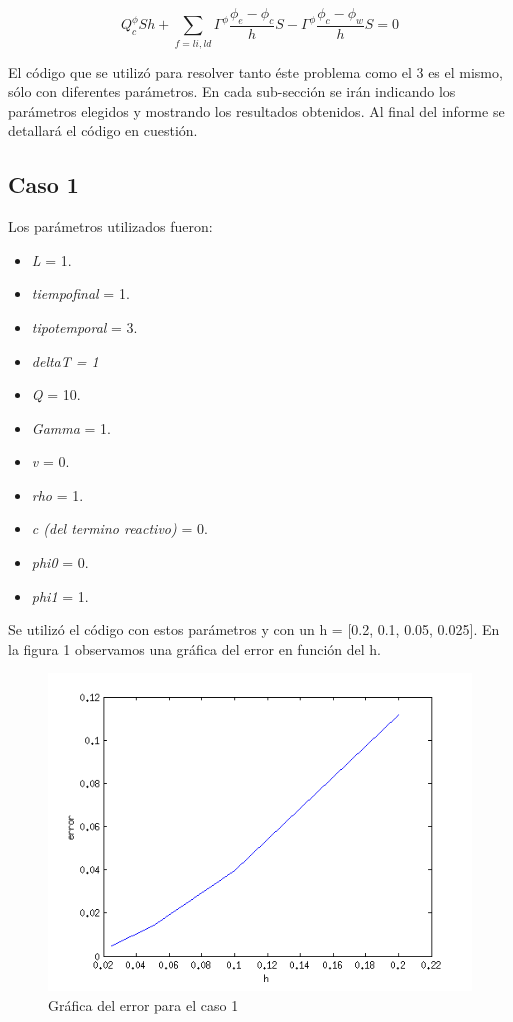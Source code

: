 \documentclass[11pt]{article}
\begin{document}
\begin{equation}
Q^{\phi}_c S h  + \sum_{f = li,ld} \Gamma^\phi \frac{\phi_e - \phi_c}{h} S - \Gamma^\phi \frac{\phi_c - \phi_w}{h} S = 0
\end{equation}

\bigskip

El c\'odigo que se utiliz\'o para resolver tanto \'este problema como el 3 es el mismo, s\'olo con diferentes par\'ametros. En cada sub-secci\'on se ir\'an indicando los par\'ametros elegidos y mostrando los resultados obtenidos. Al final del informe se detallar\'a el c\'odigo en cuesti\'on.

\subsection{Caso 1}

Los par\'ametros utilizados fueron:

\begin{itemize}
	\item \textit{L} = 1.
	\item \textit{tiempofinal} = 1.
    \item \textit{tipotemporal} = 3.
    \item \textit{deltaT = 1}
    \item \textit{Q} = 10.
    \item \textit{Gamma} = 1.
    \item \textit{v} = 0.
    \item \textit{rho} = 1.
    \item \textit{c (del termino reactivo)} = 0.
    \item \textit{phi0} = 0.
    \item \textit{phi1} = 1.
\end{itemize}

\bigskip Se utiliz\'o el c\'odigo con estos par\'ametros y con un h = [0.2, 0.1, 0.05, 0.025]. En la figura 1 observamos una gr\'afica del error en funci\'on del h.

\begin{figure}[tbh]
	\centering
		\includegraphics[width=1.0\textwidth]{imagen1.png}
	\caption{Gr\'afica del error para el caso 1}
	\label{fig:Fig1}
\end{figure}
\end{document}
